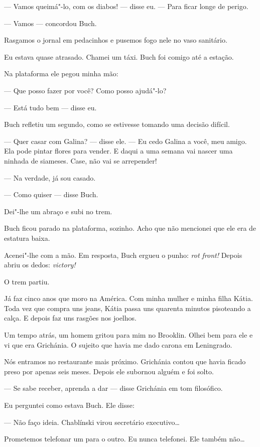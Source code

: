 --- Vamos queimá"-lo, com os diabos! --- disse eu. --- Para ficar longe
de perigo.

--- Vamos --- concordou Buch.

Rasgamos o jornal em pedacinhos e pusemos fogo nele no vaso sanitário.

Eu estava quase atrasado. Chamei um táxi. Buch foi comigo até a estação.

Na plataforma ele pegou minha mão:

--- Que posso fazer por você? Como posso ajudá"-lo?

--- Está tudo bem --- disse eu.

Buch refletiu um segundo, como se estivesse tomando uma decisão difícil. \label{ref5}

--- Quer casar com Galina? --- disse ele. --- Eu cedo Galina a você, meu
amigo. Ela pode pintar flores para vender. E daqui a uma semana vai
nascer uma ninhada de siameses. Case, não vai se arrepender!

--- Na verdade, já sou casado.

--- Como quiser --- disse Buch.

Dei"-lhe um abraço e subi no trem.

Buch ficou parado na plataforma, sozinho. Acho que não mencionei que ele
era de estatura baixa.

Acenei"-lhe com a mão. Em resposta, Buch ergueu o punho: \emph{rot
front!} Depois abriu os dedos: \emph{victory!}

O trem partiu.

Já faz cinco anos que moro na América. Com minha mulher e minha filha
Kátia. Toda vez que compra uns jeans, Kátia passa uns quarenta minutos
pisoteando a calça. E depois faz uns rasgões nos joelhos.

Um tempo atrás, um homem gritou para mim no Brooklin. Olhei bem para ele
e vi que era Grichánia. O sujeito que havia me dado carona em
Leningrado.

Nós entramos no restaurante mais próximo. Grichánia contou que havia
ficado preso por apenas seis meses. Depois ele subornou alguém e foi
solto.

--- Se sabe receber, aprenda a dar --- disse Grichánia em tom
filosófico.

Eu perguntei como estava Buch. Ele disse:

--- Não faço ideia. Chablínski virou secretário executivo\ldots{}

Prometemos telefonar um para o outro. Eu nunca telefonei. Ele também
não\ldots{}

